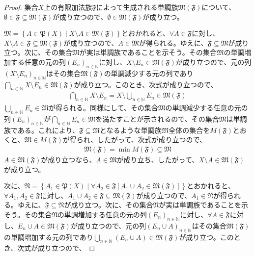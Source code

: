 \documentclass[dvipdfmx]{jsarticle}
\begin{document}
\begin{proof}
集合$X$上の有限加法族$\mathfrak{F}$によって生成される単調族$\mathfrak{M}\left( \mathfrak{F} \right)$について、$\mathfrak{\emptyset \in F \subseteq M}\left( \mathfrak{F} \right)$が成り立つので、$\mathfrak{\emptyset \in M}\left( \mathfrak{F} \right)$が成り立つ。\par
$\mathfrak{M} =\left\{ A \in \mathfrak{P}(X) \middle| X \setminus A \in \mathfrak{M}\left( \mathfrak{F} \right) \right\}$とおかれると、$\forall A \in \mathfrak{F}$に対し、$X \setminus A \in \mathfrak{F \subseteq M}\left( \mathfrak{F} \right)$が成り立つので、$A \in \mathfrak{M}$が得られる。ゆえに、$\mathfrak{F \subseteq M}$が成り立つ。次に、その集合$\mathfrak{M}$が実は単調族であることを示そう。その集合$\mathfrak{M}$の単調増加する任意の元の列$\left( E_{n} \right)_{n \in \mathbb{N}}$に対し、$X \setminus E_{n}\in \mathfrak{M}\left( \mathfrak{F} \right)$が成り立つので、元の列$\left( X \setminus E_{n} \right)_{n \in \mathbb{N}}$はその集合$\mathfrak{M}\left( \mathfrak{F} \right)$の単調減少する元の列であり$\bigcap_{n \in \mathbb{N}} {X \setminus E_{n}}\in \mathfrak{M}\left( \mathfrak{F} \right)$が成り立つ。このとき、次式が成り立つので、
\begin{align*}
\bigcap_{n \in \mathbb{N}} {X \setminus E_{n}} = X \setminus \bigcup_{n \in \mathbb{N}} E_{n}\in \mathfrak{M}\left( \mathfrak{F} \right)
\end{align*}
$\bigcup_{n \in \mathbb{N}} E_{n}\in \mathfrak{M}$が得られる。同様にして、その集合$\mathfrak{M}$の単調減少する任意の元の列$\left( E_{n} \right)_{n \in \mathbb{N}}$が$\bigcap_{n \in \mathbb{N}} E_{n}\in \mathfrak{M}$を満たすことが示されるので、その集合$\mathfrak{M}$は単調族である。これにより、$\mathfrak{F \subseteq M}$となるような単調族$\mathfrak{M}$全体の集合を$M\left( \mathfrak{F} \right)$とおくと、$\mathfrak{M \in}M\left( \mathfrak{F} \right)$が得られ、したがって、次式が成り立つので、
\begin{align*}
\mathfrak{M}\left( \mathfrak{F} \right) = \min{M\left( \mathfrak{F} \right)}\subseteq \mathfrak{M}
\end{align*}
$A \in \mathfrak{M}\left( \mathfrak{F} \right)$が成り立つなら、$A \in \mathfrak{M}$が成り立ち、したがって、$X \setminus A \in \mathfrak{M}\left( \mathfrak{F} \right)$が成り立つ。\par
次に、$\mathfrak{N} = \left\{ A_{1}\in \mathfrak{P}(X) \middle| \forall A_{2}\in \mathfrak{F}\left[ A_{1} \cup A_{2}\in \mathfrak{M}\left( \mathfrak{F} \right) \right] \right\}$とおかれると、$\forall A_{1},A_{2}\in \mathfrak{F}$に対し、$A_{1} \cup A_{2}\in \mathfrak{F \subseteq M}\left( \mathfrak{F} \right)$が成り立つので、$A_{1}\in \mathfrak{N}$が得られる。ゆえに、$\mathfrak{F \subseteq N}$が成り立つ。次に、その集合$\mathfrak{N}$が実は単調族であることを示そう。その集合$\mathfrak{N}$の単調増加する任意の元の列$\left( E_{n} \right)_{n \in \mathbb{N}}$に対し、$\forall A \in \mathfrak{F}$に対し、$E_{n} \cup A \in \mathfrak{M}\left( \mathfrak{F} \right)$が成り立つので、元の列$\left( E_{n} \cup A \right)_{n \in \mathbb{N}}$はその集合$\mathfrak{M}\left( \mathfrak{F} \right)$の単調増加する元の列であり$\bigcup_{n \in \mathbb{N}} \left( E_{n} \cup A \right)\in \mathfrak{M}\left( \mathfrak{F} \right)$が成り立つ。このとき、次式が成り立つので、

\end{proof}
\end{document}
